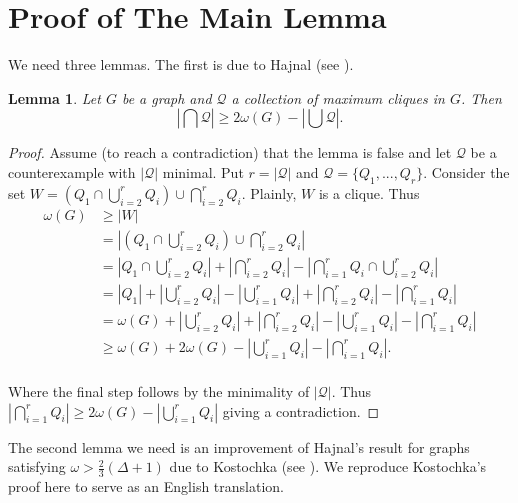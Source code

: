 \documentclass[12pt]{article}
\theoremstyle{plain}
\newtheorem{lem}[thm]{Lemma}
\theoremstyle{definition}
\theoremstyle{remark}
\begin{document}
\section{Proof of The Main Lemma}
We need three lemmas.  The first is due to Hajnal (see \cite{Hajnal}).

\begin{lem}\label{HajnalLemma}
Let $G$ be a graph and $\mathcal{Q}$ a collection of maximum cliques in $G$. Then
\[\left | \bigcap \mathcal{Q}\right | \geq 2\omega(G) - \left | \bigcup \mathcal{Q}\right |.\]
\end{lem}
\begin{proof}
Assume (to reach a contradiction) that the lemma is false and let $\mathcal{Q}$ be a counterexample with $|\mathcal{Q}|$ minimal.  Put $r = |\mathcal{Q}|$ and $\mathcal{Q} = \{Q_1, ..., Q_r\}$.  Consider the set $\displaystyle W = (Q_1 \cap \bigcup_{i=2}^r Q_i) \cup \bigcap_{i=2}^r Q_i$.  Plainly, $W$ is a clique.  Thus
\begin{align*}
\omega(G) &\geq |W| \\
&= \left |(Q_1 \cap \bigcup_{i=2}^r Q_i) \cup \bigcap_{i=2}^r Q_i \right | \\
&= \left |Q_1 \cap \bigcup_{i=2}^r Q_i \right | + \left |\bigcap_{i=2}^r Q_i \right | - \left |\bigcap_{i=1}^r Q_i \cap \bigcup_{i=2}^r Q_i \right | \\
&= \left |Q_1 \right | + \left |\bigcup_{i=2}^r Q_i \right | - \left |\bigcup_{i=1}^r Q_i \right| + \left |\bigcap_{i=2}^r Q_i \right | - \left |\bigcap_{i=1}^r Q_i \right | \\
&= \omega(G) + \left |\bigcup_{i=2}^r Q_i \right | + \left |\bigcap_{i=2}^r Q_i \right | - \left |\bigcup_{i=1}^r Q_i \right| - \left |\bigcap_{i=1}^r Q_i \right | \\
&\geq \omega(G) + 2\omega(G) - \left |\bigcup_{i=1}^r Q_i \right| - \left |\bigcap_{i=1}^r Q_i \right |. \\
\end{align*}

Where the final step follows by the minimality of $|\mathcal{Q}|$. Thus $\displaystyle \left |\bigcap_{i=1}^r Q_i \right | \geq 2\omega(G) - \left |\bigcup_{i=1}^r Q_i \right|$ giving a contradiction.
\end{proof}

The second lemma we need is an improvement of Hajnal's result for graphs satisfying $\omega > \frac{2}{3}(\Delta + 1)$ due to Kostochka (see \cite{Kostochka}).  We reproduce Kostochka's proof here to serve as an English translation.
\end{document}
